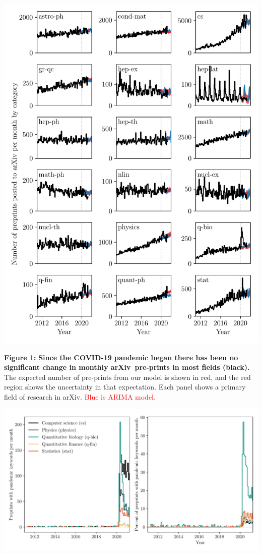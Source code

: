 \documentclass[a4paper,12pt]{article}
\newcommand{\todo}[1]{\textcolor{red}{#1}}
\newcommand{\arxiv}{arXiv}
\begin{document}
\newpage

\begin{center}
\includegraphics[width=0.95\linewidth]{pre-prints-segmented-by-field}
\end{center}

\noindent \textbf{Figure 1:} \textbf{Since the COVID-19 pandemic began there has been no significant change in monthly \arxiv\ pre-prints in most fields (black).} The expected number of pre-prints from our model is shown in red, and the red region shows the uncertainty in that expectation. Each panel shows a primary field of research in \arxiv. \todo{Blue is ARIMA model.}

\newpage

\begin{center}
 \includegraphics[width=\linewidth]{pandemic-related-preprints.pdf}
\end{center}
\end{document}
